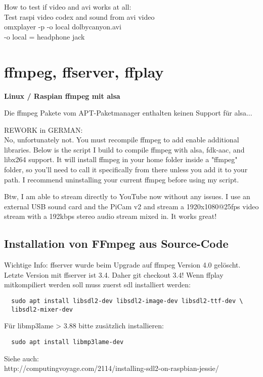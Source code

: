 How to test if video and avi works at all:\\
Test raspi video codex and sound from avi video\\
omxplayer -p -o local dolbycanyon.avi\\
-o local = headphone jack

\section{ffmpeg, ffserver, ffplay}
\textbf{Linux / Raspian ffmpeg mit alsa} %

Die ffmpeg Pakete vom APT-Paketmanager enthalten keinen Support für alsa...
   
REWORK in GERMAN:\\
No, unfortunately not. You must recompile ffmpeg to add enable additional libraries. Below is the script I build to compile ffmpeg with alsa, fdk-aac, and libx264 support. It will install ffmpeg in your home folder inside a "ffmpeg" folder, so you'll need to call it specifically from there unless you add it to your path. I recommend uninstalling your current ffmpeg before using my script.

Btw, I am able to stream directly to YouTube now without any issues. I use an external USB sound card and the PiCam v2 and stream a 1920x1080@25fps video stream with a 192kbps stereo audio stream mixed in. It works great!

\subsection{Installation von FFmpeg aus Source-Code}
Wichtige Info: ffserver wurde beim Upgrade auf ffmpeg Version 4.0 gelöscht. Letzte Version mit ffserver ist 3.4. Daher git checkout 3.4! Wenn ffplay mitkompiliert werden soll muss zuerst sdl installiert werden:
\begin{verbatim}
  sudo apt install libsdl2-dev libsdl2-image-dev libsdl2-ttf-dev \
  libsdl2-mixer-dev
\end{verbatim}

Für libmp3lame > 3.88 bitte zusätzlich installieren:
\begin{verbatim}
  sudo apt install libmp3lame-dev
\end{verbatim}

Siehe auch:\\
http://computingvoyage.com/2114/installing-sdl2-on-raspbian-jessie/

